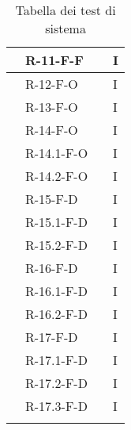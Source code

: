 \begin{center}
\begin{longtable}{ | C{2.5cm} |C{2cm} |C{7cm} |C{1.5cm}|}
                     & R-11-F-F           &                      & I              \\\hline
                     & R-12-F-O           &                      & I              \\\hline
                     & R-13-F-O           &                      & I              \\\hline
                     & R-14-F-O           &                      & I              \\\hline
                     & R-14.1-F-O         &                      & I              \\\hline
                     & R-14.2-F-O         &                      & I              \\\hline
                     & R-15-F-D           &                      & I              \\\hline
                     & R-15.1-F-D         &                      & I              \\\hline
                     & R-15.2-F-D         &                      & I              \\\hline
                     & R-16-F-D           &                      & I              \\\hline
                     & R-16.1-F-D         &                      & I              \\\hline
                     & R-16.2-F-D         &                      & I              \\\hline
                     & R-17-F-D           &                      & I              \\\hline
                     & R-17.1-F-D         &                      & I              \\\hline
                     & R-17.2-F-D         &                      & I              \\\hline
                     & R-17.3-F-D         &                      & I              \\\hline

        \caption{Tabella dei test di sistema}
    \end{longtable}
\end{center}
\setcounter{subCount}{0}
\setcounter{rowcount}{0}
